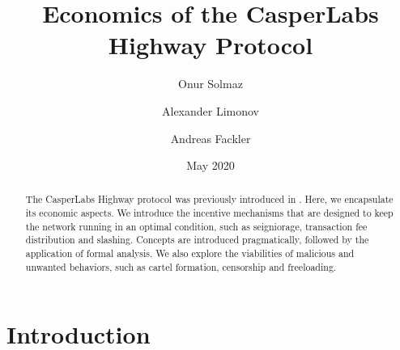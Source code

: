 \documentclass[12pt]{article}
\title{Economics of the CasperLabs Highway Protocol}
\author{Onur Solmaz}
\author{Alexander Limonov}
\author{Andreas Fackler}
\affil{CasperLabs}
\date{May 2020}
\begin{document}
\maketitle

\begin{abstract}
  The CasperLabs Highway protocol was previously introduced in \cite{kane2019casperlabs}. Here, we encapsulate its economic aspects. We introduce the incentive mechanisms that are designed to keep the network running in an optimal condition, such as seigniorage, transaction fee distribution and slashing. Concepts are introduced pragmatically, followed by the application of formal analysis. We also explore the viabilities of malicious and unwanted behaviors, such as cartel formation, censorship and freeloading.
\end{abstract}

\tableofcontents
\pagebreak

\section*{Introduction}



\newpage

\printbibliography
\end{document}
